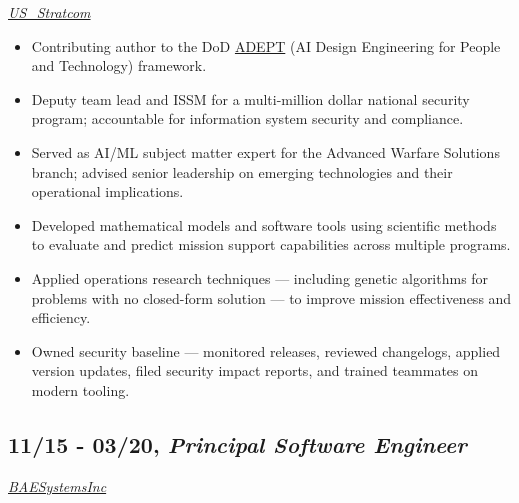 \documentclass[10pt]{article}
\def\tightlist{}
\begin{document}
\emph{\href{https://twitter.com/US_Stratcom}{US\_Stratcom}}

\begin{itemize}
\tightlist
\item
  Contributing author to the DoD
  \href{https://community.apan.org/wg/adept-framework/}{ADEPT} (AI
  Design Engineering for People and Technology) framework.
\item
  Deputy team lead and ISSM for a multi-million dollar national security
  program; accountable for information system security and compliance.
\item
  Served as AI/ML subject matter expert for the Advanced Warfare
  Solutions branch; advised senior leadership on emerging technologies
  and their operational implications.
\item
  Developed mathematical models and software tools using scientific
  methods to evaluate and predict mission support capabilities across
  multiple programs.
\item
  Applied operations research techniques --- including genetic
  algorithms for problems with no closed-form solution --- to improve
  mission effectiveness and efficiency.
\item
  Owned security baseline --- monitored releases, reviewed changelogs,
  applied version updates, filed security impact reports, and trained
  teammates on modern tooling.
\end{itemize}

\subsection{\texorpdfstring{11/15 - 03/20, \textbf{\emph{Principal
Software
Engineer}}}{11/15 - 03/20, Principal Software Engineer}}\label{principal-software-engineer}

\emph{\href{https://twitter.com/BAESystemsInc}{BAESystemsInc}}
\end{document}
